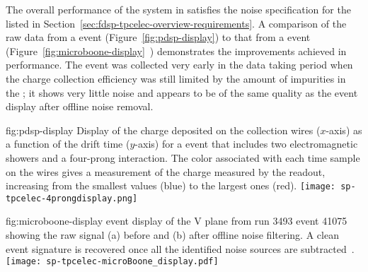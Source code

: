 The overall performance of the  system in 
 satisfies the 
 noise specification %
for the  %
listed in Section~\ref{sec:fdsp-tpcelec-overview-requirements}. 
%
A comparison of the raw data from 
a  event (Figure~\ref{fig:pdsp-display}) to 
that from a  event (Figure~\ref{fig:microboone-display}~\cite{Acciarri:2017sde}) demonstrates the improvements achieved in  performance. 
The  event was collected very early in the data taking
period when the charge collection efficiency was still limited
by the amount of impurities in the ; it shows very little
noise and appears to be of the same quality as the 
event display after offline noise removal. 


\begin{dunefigure}
{fig:pdsp-display}
{Display of the charge deposited on the collection wires ($x$-axis) as
a function of the drift time ($y$-axis) for a  event 
that includes two electromagnetic showers and a four-prong interaction.
The color associated with each time sample on the 
wires gives a measurement of the charge measured by the 
readout, increasing from the smallest values (blue) to the largest
ones (red).}
\texttt{[image: sp-tpcelec-4prongdisplay.png]}
\end{dunefigure}

\begin{dunefigure}
{fig:microboone-display}
{ \twod event display of the V plane from run 3493 
event 41075 showing the raw signal (a) before and (b) after offline 
noise filtering. A clean event signature is recovered once all the 
identified noise sources are subtracted~\cite{Acciarri:2017sde}.}
\texttt{[image: sp-tpcelec-microBoone\_display.pdf]}
\end{dunefigure}

